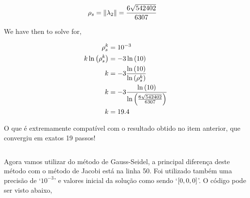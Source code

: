 \documentclass[twoside]{amsart}
\numberwithin{equation}{section}
\begin{document}
\begin{align}
    \rho_s &=\norm{\lambda_2}=\frac{6\sqrt{542402}}{6307}
\end{align}

We have then to solve for,

\begin{align}
    \rho_s^k&=10^{-3}\\
    k\ln\qty(\rho_s^k)&=-3\ln\qty(10)\\
    k&=-3\frac{\ln\qty(10)}{\ln\qty(\rho_s^k)}\\
    k&=-3\frac{\ln\qty(10)}{\ln\qty(\frac{6\sqrt{542402}}{6307})}\\
    k&=19.4
\end{align}

O que é extremamente compatível com o resultado obtido no item anterior, que convergiu em exatos 19 passos!

\subsection{}

Agora vamos utilizar do método de Gauss-Seidel, a principal diferença deste método com o método 
de Jacobi está na linha 50. Foi utilizado também uma precisão de `$10^{-3}$' e valores inicial da 
solução como sendo `$\qty[0,0,0]$'. O código pode ser visto abaixo,
\end{document}
